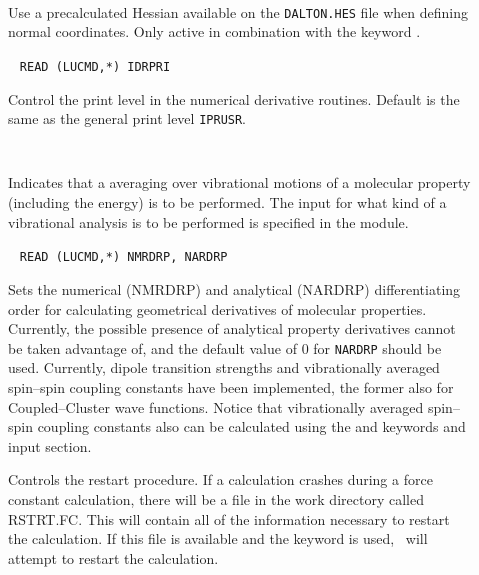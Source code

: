 \begin{description}
\item[]\verb| |\newline

Use a precalculated Hessian available on the \verb|DALTON.HES| file
when defining normal coordinates. Only active in combination with the
keyword .

\item[]\verb| |\newline
\verb|READ (LUCMD,*) IDRPRI|

Control the print level in the numerical derivative routines. Default
is the same as the general print level \verb|IPRUSR|.

\item[]\verb| |\newline

Indicates that a averaging over vibrational motions of a molecular
property (including the energy) is to be performed. The input
for what kind of a vibrational analysis is to be performed is
specified in the  module.

\item[]\verb| |\newline
\verb|READ (LUCMD,*) NMRDRP, NARDRP|

Sets the numerical (NMRDRP) and analytical (NARDRP) differentiating
order for calculating geometrical derivatives of molecular
properties. Currently, the possible presence of analytical property
derivatives cannot be taken advantage of, and the default value of $0$
for \verb|NARDRP| should be used. Currently, dipole transition
strengths and vibrationally averaged spin--spin coupling constants
have been implemented, the former also for Coupled--Cluster wave
functions. Notice that vibrationally
averaged spin--spin coupling constants also can be calculated using
the  and  keywords and input section.

\item[]
Controls the restart procedure. If a calculation crashes during a
force constant calculation, there will be a file in the work directory
called RSTRT.FC. This will contain all of the information necessary to
restart the calculation. If this file is available and the keyword is
used, \dalton\ will attempt to restart the calculation. 

\item[]\verb| |\newline


\end{description}
